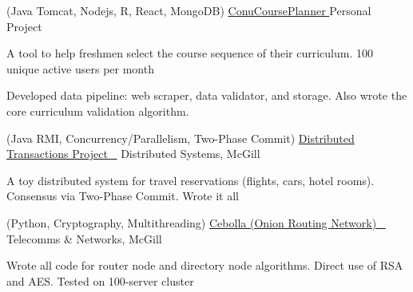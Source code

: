 \begin{cventries}
\cventry
  {(Java Tomcat, Nodejs, R, React, MongoDB)} %
  {\textcolor{darkblue}{\href{http://conucourseplanner.online}{ConuCoursePlanner \color{darkblue}{\faLink}} \href{https://github.com/stumash/CoursePlanner}{\faGithubSquare\acvHeaderIconSep}}} %
  {Personal Project} %
  {} %
  { %
    \begin{cvitems}
    \item {A tool to help freshmen select the course sequence of their curriculum. 100 unique active users per month}
    \item {Developed data pipeline: web scraper, data validator, and storage. Also wrote the core curriculum validation algorithm.}
    \end{cvitems}
  }


\cventry
  {(Java RMI, Concurrency/Parallelism, Two-Phase Commit)} %
  {\textcolor{darkblue}{\href{https://github.com/stumash/DistributedSystemsProject}{Distributed Transactions Project \ \faGithubSquare\acvHeaderIconSep}}} %
  {Distributed Systems, McGill} %
  {} %
  { %
    \begin{cvitems}
    \item {A toy distributed system for travel reservations (flights, cars, hotel rooms). Consensus via Two-Phase Commit. Wrote it all}
    \end{cvitems}
  }


\cventry
  {(Python, Cryptography, Multithreading)} %
  {
    \textcolor{darkblue}{\href{https://github.com/CamiloGarciaLaRotta/Cebolla}{Cebolla (Onion Routing Network) \ \faGithubSquare\acvHeaderIconSep}}
    \href{https://www.youtube.com/watch?v=jR9N_xxLs6A}{\color{darkred}{\faYoutubePlay}}
  } %
  {Telecomms \& Networks, McGill} %
  {} %
  { %
    \begin{cvitems}
    \item {Wrote all code for router node and directory node algorithms. Direct use of RSA and AES. Tested on 100-server cluster}
    \end{cvitems}
  }


\end{cventries}
